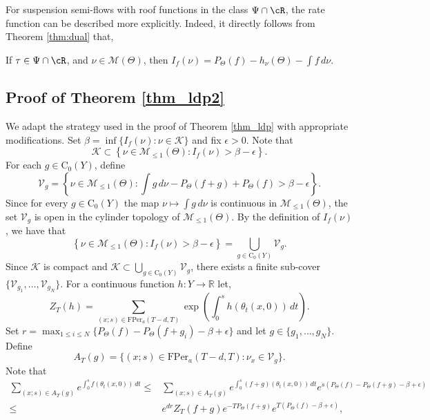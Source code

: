 \documentclass[letterpaper,11pt]{amsart}
\numberwithin{equation}{section}     %
\newcommand{\K}{\mathcal{K}}
\newcommand{\M}{\mathcal{M}}
\newcommand{\R}{\mathbb{R}}
\def\R{{\mathbb R}}
\def\M{{\mathcal M}}
\def\le{\leqslant}
\def\M{\mathcal{M}}
\begin{document}
For suspension semi-flows with roof functions in the class $\Psi \cap \cR$, the rate function can be described more explicitly. Indeed, it directly follows from Theorem \ref{thm:dual} that, 

\begin{corollary}\label{cor:R} If $\tau\in \Psi\cap\cR$, and $\nu\in \M(\Theta)$,  then $I_f(\nu)=P_\Theta(f)-h_\nu(\Theta)-\int f \, d\nu$.
\end{corollary}


\subsection{Proof of Theorem \ref{thm_ldp2}} 

We adapt the strategy used in the proof of Theorem  \ref{thm_ldp} with appropriate modifications. Set $\beta=\inf\{I_f(\nu):\nu\in \mathcal{K}\}$ and fix $\epsilon >0$. Note that
\begin{equation*}
\K \subset \left\{	 \nu \in \M_{\le 1}(\Theta): I_f(\nu) > \beta - \epsilon	 \right\}.
\end{equation*}
For each $g\in \mathrm{C}_0(Y)$, define 
$$\mathcal{V}_g= \left\{	 \nu \in \M_{\le 1}(\Theta): \int g \, d \nu - P_\Theta(f+g) + P_\Theta(f) > \beta - \epsilon	\right\}.$$  
Since for every  $g\in \mathrm{C}_0(Y)$ the map $\nu \mapsto  \int g \, d \nu$ is continuous in $\M_{\le 1}(\Theta)$,  the set $\mathcal{V}_g$ is open in the cylinder topology of $\M_{\le1}(\Theta)$. By the definition of $I_f(\nu)$,  we have that
$$\left\{	 \nu \in \M_{\le 1}(\Theta): I_f(\nu) > \beta - \epsilon	 \right\} =  \bigcup_{g \in \mathrm{C}_0(Y)}\mathcal{V}_g.$$
 Since $\K$ is compact and $\mathcal{K}\subset  \bigcup_{g \in \mathrm{C}_0(Y)}\mathcal{V}_g$, there exists a finite sub-cover $\{\mathcal{V}_{g_1}, \dots , \mathcal{V}_{g_N}\}$. 
For a continuous function $h:Y\to\R$ let,
$$Z_T(h)=\sum_{(x;s)\in \mathrm{FPer}_a(T-d,T)} \exp\left( \int_0^s h(\theta_t(x,0))  \, dt \right). $$
Set $r=\max_{1\le i\le N}\{P_\Theta(f)-P_\Theta(f+g_i)-\beta+\epsilon\}$ and let $g\in\{g_1,\ldots,g_N\}$. Define 
$$A_T(g)=\{(x;s)\in\mathrm{FPer}_a(T-d,T):\nu_x\in \mathcal{V}_g\}.$$ 
Note that 
 \begin{align*}
\sum_{(x;s)\in A_T(g) } e^{ \int_0^s f(\theta_t(x,0)) \, dt } \le & \sum_{(x;s)\in A_T(g) } e^{ \int_0^s (f+g)(\theta_t(x,0)) \, dt } e^{s(P_\Theta(f)-P_\Theta(f+g)-\beta+\epsilon)}\\
\le & e^{dr}Z_T(f+g)e^{-TP_\Theta(f+g)}e^{T(P_\Theta(f)-\beta+\epsilon)},
\end{align*}
\end{document}

